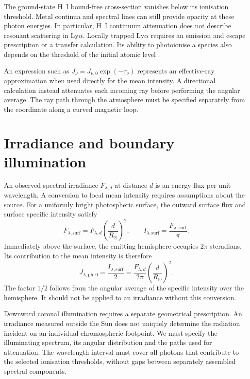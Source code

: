 \documentclass[a4paper,10pt,twoside,openany]{book}
\newenvironment{caution}[1]{%
  \begin{tcolorbox}[notebox,colback=LightOrange,colframe=Cap2Orange,
    colbacktitle=Cap2Orange,coltitle=white,
    title={#1}]}{\end{tcolorbox}}
\begin{document}
\begin{caution}{Limits of H-only continuum attenuation}
The ground-state H~I bound-free cross-section vanishes below its ionisation
threshold. Metal continua and spectral lines can still provide opacity at
these photon energies. In particular, H~I continuum attenuation does not
describe resonant scattering in Ly\(\alpha\). Locally trapped Ly\(\alpha\)
requires an emission and escape prescription or a transfer calculation.
Its ability to photoionise a species also depends on the threshold of the
initial atomic level \cite{laming2015,dufresne2025}.
\end{caution}

An expression such as \(J_\nu=J_{\nu,0}\exp(-\tau_\nu)\) represents an
effective-ray approximation when used directly for the mean intensity.
A directional calculation instead attenuates each incoming ray before
performing the angular average. The ray path through the atmosphere must be
specified separately from the coordinate along a curved magnetic loop.

\section{Irradiance and boundary illumination}
\label{subsec:ion_boundary_radiation}

An observed spectral irradiance \(F_{\lambda,d}\) at distance \(d\) is an energy
flux per unit wavelength. A conversion to local mean intensity requires
assumptions about the source. For a uniformly bright photospheric surface,
the outward surface flux and surface specific intensity satisfy
\begin{equation}
 F_{\lambda,\mathrm{surf}}
 =F_{\lambda,d}\left(\frac{d}{R_\odot}\right)^2,
 \qquad
 I_{\lambda,\mathrm{surf}}
 =\frac{F_{\lambda,\mathrm{surf}}}{\pi}.
 \label{eq:ion_irradiance_conversion}
\end{equation}
Immediately above the surface, the emitting hemisphere occupies
\(2\pi\) steradians. Its contribution to the mean intensity is therefore
\begin{equation}
 J_{\lambda,\mathrm{ph},0}
 =\frac{I_{\lambda,\mathrm{surf}}}{2}
 =\frac{F_{\lambda,d}}{2\pi}
 \left(\frac{d}{R_\odot}\right)^2.
 \label{eq:ion_photospheric_boundary}
\end{equation}
The factor \(1/2\) follows from the angular average of the specific intensity
over the hemisphere. It should not be applied to an irradiance without this
conversion.

Downward coronal illumination requires a separate geometrical prescription.
An irradiance measured outside the Sun does not uniquely determine the
radiation incident on an individual chromospheric footpoint.
We must specify the illuminating spectrum, its angular distribution and the
paths used for attenuation. The wavelength interval must cover all photons
that contribute to the selected ionisation thresholds, without gaps between
separately assembled spectral components.
\end{document}
